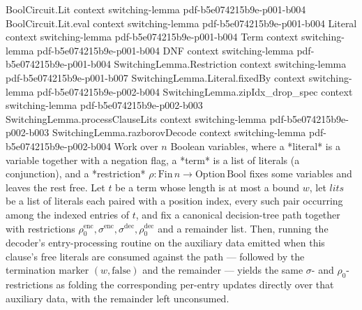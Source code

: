 \begin{lemma}
\label{SwitchingLemma.processEntries_of_processClauseLits}
\leanok
{}
\proofstep
  {BoolCircuit.Lit}
  {context}
  {switching-lemma}
  {pdf-b5e074215b9e-p001-b004}
\proofstep
  {BoolCircuit.Lit.eval}
  {context}
  {switching-lemma}
  {pdf-b5e074215b9e-p001-b004}
\proofstep
  {Literal}
  {context}
  {switching-lemma}
  {pdf-b5e074215b9e-p001-b004}
\proofstep
  {Term}
  {context}
  {switching-lemma}
  {pdf-b5e074215b9e-p001-b004}
\proofstep
  {DNF}
  {context}
  {switching-lemma}
  {pdf-b5e074215b9e-p001-b004}
\proofstep
  {SwitchingLemma.Restriction}
  {context}
  {switching-lemma}
  {pdf-b5e074215b9e-p001-b007}
\proofstep
  {SwitchingLemma.Literal.fixedBy}
  {context}
  {switching-lemma}
  {pdf-b5e074215b9e-p002-b004}
\proofstep
  {SwitchingLemma.zipIdx_drop_spec}
  {context}
  {switching-lemma}
  {pdf-b5e074215b9e-p002-b003}
\proofstep
  {SwitchingLemma.processClauseLits}
  {context}
  {switching-lemma}
  {pdf-b5e074215b9e-p002-b003}
\proofstep
  {SwitchingLemma.razborovDecode}
  {context}
  {switching-lemma}
  {pdf-b5e074215b9e-p002-b004}
Work over $n$ Boolean variables, where a *literal* is a variable together with a
negation flag, a *term* is a list of literals (a conjunction), and a *restriction* $\rho
: \mathrm{Fin}\,n \to \mathrm{Option}\,\mathrm{Bool}$ fixes some variables and leaves
the rest free. Let $t$ be a term whose length is at most a bound $w$, let
$\mathit{lits}$ be a list of literals each paired with a position index, every such pair
occurring among the indexed entries of $t$, and fix a canonical decision-tree path
together with restrictions $\rho_0^{\mathrm{enc}}, \sigma^{\mathrm{enc}},
\sigma^{\mathrm{dec}}, \rho_0^{\mathrm{dec}}$ and a remainder list. Then, running the
decoder's entry-processing routine on the auxiliary data emitted when this clause's free
literals are consumed against the path — followed by the termination marker $(w,
\mathrm{false})$ and the remainder — yields the same $\sigma$- and $\rho_0$-restrictions
as folding the corresponding per-entry updates directly over that auxiliary data, with
the remainder left unconsumed.
\end{lemma}

